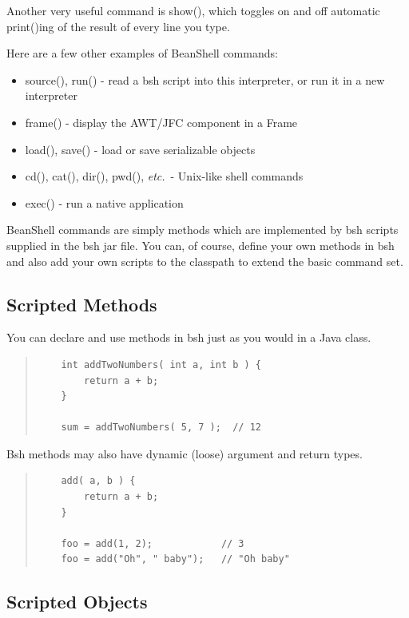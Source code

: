 \documentclass[twoside,11pt]{article}
\renewcommand{\_}{\texttt{\symbol{95}}}
\newcommand{\etc}{\textit{etc.}}
\begin{document}
Another very useful command is show(), which toggles on and off
automatic print()ing of the result of every line you type.

Here are a few other examples of BeanShell commands:
\begin{itemize}
 \item source(), run() - read a bsh script into this interpreter, or
       run it in a new interpreter
 \item frame() - display the AWT/JFC component in a Frame
 \item load(), save() - load or save serializable objects
 \item cd(), cat(), dir(), pwd(), \etc\  - Unix-like shell commands
 \item exec() - run a native application
\end{itemize}

BeanShell commands are simply methods which are implemented by bsh scripts
supplied in the bsh jar file.  You can, of course, define your own methods
in bsh and also add your own scripts to the classpath to extend the basic
command set.

\subsection{Scripted Methods}

You can declare and use methods in bsh just as you would in a Java class.
\begin{quote}
\begin{verbatim}
    int addTwoNumbers( int a, int b ) {
        return a + b;
    }

    sum = addTwoNumbers( 5, 7 );  // 12
\end{verbatim}
\end{quote}
Bsh methods may also have dynamic (loose) argument and return types.
\begin{quote}
\begin{verbatim}
    add( a, b ) {
        return a + b;
    }

    foo = add(1, 2);            // 3
    foo = add("Oh", " baby");   // "Oh baby"
\end{verbatim}
\end{quote}

\subsection{Scripted Objects}
\end{document}
